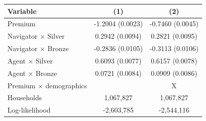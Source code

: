 
\begin{tabular}{lcc}
\toprule
Variable & (1) & (2)\\
\midrule
Premium & -1.2004 (0.0023) & -0.7460 (0.0045)\\
Navigator $\times$ Silver & 0.2942 (0.0094) & 0.2821 (0.0095)\\
Navigator $\times$ Bronze & -0.2836 (0.0105) & -0.3113 (0.0106)\\
Agent $\times$ Silver & 0.6093 (0.0077) & 0.6157 (0.0078)\\
Agent $\times$ Bronze & 0.0721 (0.0084) & 0.0909 (0.0086)\\
Premium $\times$ demographics &  & X\\
Households & 1,067,827 & 1,067,827\\
Log-likelihood & -2,603,785 & -2,544,116\\
\bottomrule
\end{tabular}
